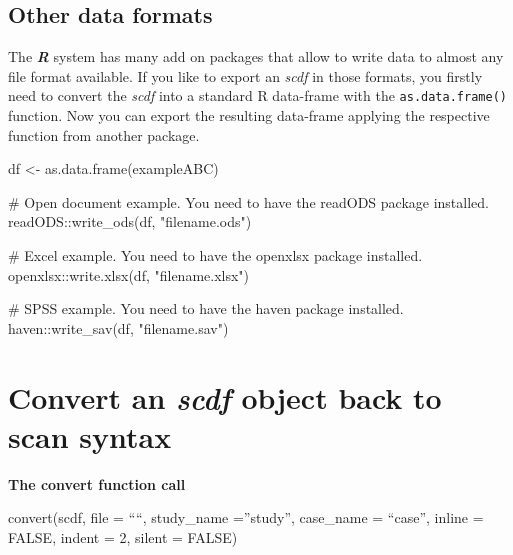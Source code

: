 \documentclass[
  letterpaper,
  DIV=11,
  numbers=noendperiod]{scrreprt}
\newenvironment{Shaded}{\begin{snugshade}}{\end{snugshade}}
\newcommand{\CommentTok}[1]{\textcolor[rgb]{0.37,0.37,0.37}{#1}}
\newcommand{\FunctionTok}[1]{\textcolor[rgb]{0.28,0.35,0.67}{#1}}
\newcommand{\NormalTok}[1]{\textcolor[rgb]{0.00,0.23,0.31}{#1}}
\newcommand{\OtherTok}[1]{\textcolor[rgb]{0.00,0.23,0.31}{#1}}
\newcommand{\SpecialCharTok}[1]{\textcolor[rgb]{0.37,0.37,0.37}{#1}}
\newcommand{\StringTok}[1]{\textcolor[rgb]{0.13,0.47,0.30}{#1}}
\begin{document}
\hypertarget{other-data-formats-1}{%
\subsection{Other data formats}\label{other-data-formats-1}}

The \textbf{\emph{R}} system has many add on packages that allow to
write data to almost any file format available. If you like to export an
\emph{scdf} in those formats, you firstly need to convert the
\emph{scdf} into a standard R data-frame with the
\texttt{as.data.frame()} function. Now you can export the resulting
data-frame applying the respective function from another package.

\begin{Shaded}
\begin{Highlighting}[]
\NormalTok{df }\OtherTok{\textless{}{-}} \FunctionTok{as.data.frame}\NormalTok{(exampleABC)}

\CommentTok{\# Open document example. You need to have the readODS package installed.}
\NormalTok{readODS}\SpecialCharTok{::}\FunctionTok{write\_ods}\NormalTok{(df, }\StringTok{"filename.ods"}\NormalTok{)}

\CommentTok{\# Excel example. You need to have the openxlsx package installed.}
\NormalTok{openxlsx}\SpecialCharTok{::}\FunctionTok{write.xlsx}\NormalTok{(df, }\StringTok{"filename.xlsx"}\NormalTok{)}

\CommentTok{\# SPSS example. You need to have the haven package installed.}
\NormalTok{haven}\SpecialCharTok{::}\FunctionTok{write\_sav}\NormalTok{(df, }\StringTok{"filename.sav"}\NormalTok{)}
\end{Highlighting}
\end{Shaded}

\hypertarget{sec-convert}{%
\section{\texorpdfstring{Convert an \emph{scdf} object back to scan
syntax}{Convert an scdf object back to scan syntax}}\label{sec-convert}}

\begin{tcolorbox}[enhanced jigsaw, breakable, rightrule=.15mm, bottomrule=.15mm, arc=.35mm, colback=white, colframe=quarto-callout-tip-color-frame, opacityback=0, leftrule=.75mm, toprule=.15mm, left=2mm]
\begin{minipage}[t]{5.5mm}
\textcolor{quarto-callout-tip-color}{\faLightbulb}
\end{minipage}%
\begin{minipage}[t]{\textwidth - 5.5mm}

\textbf{The convert function call}\vspace{2mm}

convert(scdf, file = ````, study\_name =''study'', case\_name =
``case'', inline = FALSE, indent = 2, silent = FALSE)

\end{minipage}%
\end{tcolorbox}
\end{document}
